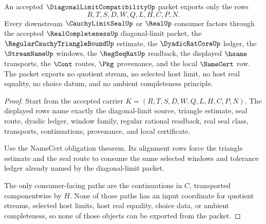 \begin{theorem}
\label{thm:diagonal-limit-compatibility-non-escape}
An accepted $\DiagonalLimitCompatibilityUp$ packet exports only the rows
$$
R,T,S,D,W,Q,L,H,C,P,N.
$$
Every downstream $\CauchyLimitSealUp$ or $\RealUp$ consumer factors through
the accepted $\RealCompletenessUp$ diagonal-limit packet, the
$\RegularCauchyTriangleBoundUp$ estimate, the $\DyadicRatCoreUp$ ledger, the
$\StreamNameUp$ windows, the $\RegSeqRatUp$ readback, the displayed
$\hsame$ transports, the $\Cont$ routes, $\Pkg$ provenance, and the local
$\NameCert$ row. The packet exports no quotient stream, no selected host
limit, no host real equality, no choice datum, and no ambient completeness
principle.
\end{theorem}
\begin{proof}
Start from the accepted carrier
$K=(R,T,S,D,W,Q,L,H,C,P,N)$. The displayed rows name exactly the
diagonal-limit source, triangle estimate, seal route, dyadic ledger, window
family, regular rational readback, real seal class, transports, continuations,
provenance, and local certificate.

Use the NameCert obligation theorem. Its alignment rows force the triangle
estimate and the seal route to consume the same selected windows and tolerance
ledger already named by the diagonal-limit packet.

The only consumer-facing paths are the continuations in $C$, transported
componentwise by $H$. None of those paths has an input coordinate for quotient
streams, selected host limits, host real equality, choice data, or ambient
completeness, so none of those objects can be exported from the packet.
\end{proof}

